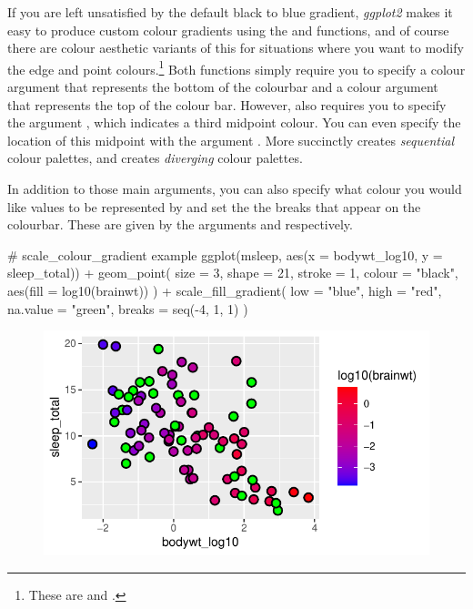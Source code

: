 If you are left unsatisfied by the default black to blue gradient, \textit{ggplot2} makes it easy to produce custom colour gradients using the  and  functions, and of course there are colour aesthetic variants of this for situations where you want to modify the edge and point colours.\footnote{These are  and .} Both functions simply require you to specify a  colour argument that represents the bottom of the colourbar and a  colour argument that represents the top of the colour bar. However,  also requires you to specify the argument , which indicates a third midpoint colour. You can even specify the location of this midpoint with the argument . More succinctly  creates \textit{sequential} colour palettes, and  creates \textit{diverging} colour palettes.

In addition to those main arguments, you can also specify what colour you would like  values to be represented by and set the the breaks that appear on the colourbar. These are given by the arguments  and  respectively.

\begin{inR}
# scale_colour_gradient example
ggplot(msleep, aes(x = bodywt_log10, y = sleep_total)) +
  geom_point(
    size = 3, shape = 21, stroke = 1, colour = "black",
    aes(fill = log10(brainwt))
  ) +
  scale_fill_gradient(
    low = "blue",
    high = "red",
    na.value = "green", 
    breaks = seq(-4, 1, 1)
  )
\end{inR}

\vspace{2em}

\begin{figure}[H]
\includegraphics[scale = .75]{graphics/ch2Figs/ggEx_27.pdf}
\end{figure}

